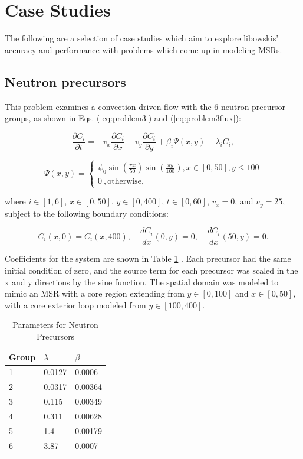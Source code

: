 \section{Case Studies}
The following are a selection of case studies which aim to explore libowskis' accuracy and performance with problems which come up in modeling MSRs. 

\subsection{Neutron precursors}
This problem examines a convection-driven flow with the 6 neutron precursor groups, as shown in Eqs. (\ref{eq:problem3}) and (\ref{eq:problem3flux}): 

\begin{equation}
\frac{\partial C_{i}}{\partial t} = -v_{x}\frac{\partial C_{i}}{\partial x} - v_{y}\frac{\partial C_{i}}{\partial y} + \beta_{i} \Psi (x, y) -\lambda_i C_{i},
\label{eq:problem3}
\end{equation}

\begin{equation}
\Psi (x, y) = \begin{cases}
  \psi _0 \sin\left(\frac{\pi x}{50}\right)\sin\left(\frac{\pi y}{100}\right) , x \in [0,50], y \le 100 \\
  0\ , \text{otherwise},
  \label{eq:problem3flux}
\end{cases}
\end{equation}

\noindent where $i \in [1,6]$, $x \in [0, 50]$, $y \in [0, 400]$, $t \in [0, 60]$, $v_{x} = 0$, and $v_{y} = 25$, subject to the following boundary conditions:

\begin{equation}
    C_{i}(x,0) = C_{i}(x,400), \quad \frac{dC_{i}}{dx}(0,y) = 0, \quad \frac{dC_{i}}{dx}(50, y) = 0.
\end{equation}

Coefficients for the system are shown in Table \ref{tab:precursorCoeffs} \cite{ott1985}. 
Each precursor had the same initial condition of zero, and the source term for each precursor was scaled in the x and y directions by the sine function. The spatial domain was modeled to mimic an MSR with a core region extending from $y \in [0,100]$ and $x \in [0,50]$, with a core exterior loop modeled from $y \in [100, 400]$. 

\begin{table}[h!]
   \caption{\label{tab:precursorCoeffs} Parameters for Neutron Precursors}
   \centering
   \begin{tabular}{lll}
   \hline
   Group & $\lambda$ & $\beta$ \\
   \hline
   1 & 0.0127 & 0.0006 \\
   2 & 0.0317 & 0.00364 \\
   3 & 0.115 & 0.00349 \\
   4 & 0.311& 0.00628 \\
   5 & 1.4 & 0.00179\\
   6 & 3.87 & 0.0007 \\
   \hline
   \end{tabular}
\end{table}     

